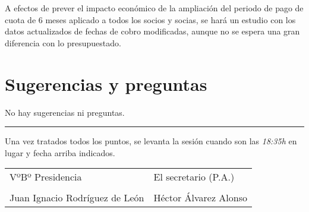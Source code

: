 \documentclass[a4paper,12pt]{article}
\begin{document}
A efectos de prever el impacto económico de la ampliación del periodo de pago de cuota de 6 meses aplicado a todos los socios y socias, se hará un estudio con los datos actualizados de fechas de cobro modificadas, aunque no se espera una gran diferencia con lo presupuestado.

\section{Sugerencias y preguntas}

No hay sugerencias ni preguntas.


\vspace{1cm}
\hrule
\vspace{3mm}

Una vez tratados todos los puntos, se levanta la sesión cuando son las \textit{18:35h} en lugar y fecha arriba indicados.

\vspace{1cm}

\begin{table}[h]
    \begin{tabular}{p{9cm}p{9cm}}
        VºBº Presidencia & El secretario (P.A.) \\
        \vspace{3cm} & \vspace{3cm} \\
        Juan Ignacio Rodríguez de León & Héctor Álvarez Alonso \\
    \end{tabular}
\end{table}
\end{document}
